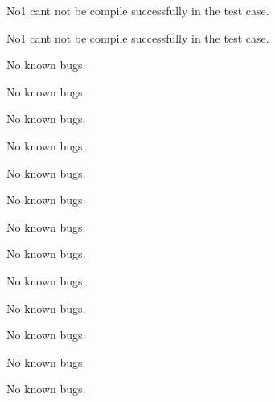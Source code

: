 \begin{DoxyRefList}
No1 can\textquotesingle{}t not be compile successfully in the test case.  
\item[\label{bug__bug000009}%
\hypertarget{bug__bug000009}{}%
File \hyperlink{pclCloudViewer_8h}{pcl\+Cloud\+Viewer.h} ]No1 can\textquotesingle{}t not be compile successfully in the test case.  
\item[\label{bug__bug000012}%
\hypertarget{bug__bug000012}{}%
Class \hyperlink{classpclFastTriangular}{pcl\+Fast\+Triangular} ]No known bugs.  
\item[\label{bug__bug000031}%
\hypertarget{bug__bug000031}{}%
File \hyperlink{pclFastTriangular_8cpp}{pcl\+Fast\+Triangular.cpp} ]No known bugs.  
\item[\label{bug__bug000011}%
\hypertarget{bug__bug000011}{}%
File \hyperlink{pclFastTriangular_8h}{pcl\+Fast\+Triangular.h} ]No known bugs.  
\item[\label{bug__bug000038}%
\hypertarget{bug__bug000038}{}%
File \hyperlink{pclFastTriangularTest_8cpp}{pcl\+Fast\+Triangular\+Test.cpp} ]No known bugs.  
\item[\label{bug__bug000014}%
\hypertarget{bug__bug000014}{}%
Class \hyperlink{classpclIo}{pcl\+Io} ]No known bugs.  
\item[\label{bug__bug000032}%
\hypertarget{bug__bug000032}{}%
File \hyperlink{pclIo_8cpp}{pcl\+Io.cpp} ]No known bugs.  
\item[\label{bug__bug000013}%
\hypertarget{bug__bug000013}{}%
File \hyperlink{pclIo_8h}{pcl\+Io.h} ]No known bugs.  
\item[\label{bug__bug000039}%
\hypertarget{bug__bug000039}{}%
File \hyperlink{pclIoTest_8cpp}{pcl\+Io\+Test.cpp} ]No known bugs.  
\item[\label{bug__bug000016}%
\hypertarget{bug__bug000016}{}%
Class \hyperlink{classpclMlsSmoothing}{pcl\+Mls\+Smoothing} ]No known bugs.  
\item[\label{bug__bug000033}%
\hypertarget{bug__bug000033}{}%
File \hyperlink{pclMlsSmoothing_8cpp}{pcl\+Mls\+Smoothing.cpp} ]No known bugs.  
\item[\label{bug__bug000015}%
\hypertarget{bug__bug000015}{}%
File \hyperlink{pclMlsSmoothing_8h}{pcl\+Mls\+Smoothing.h} ]No known bugs.  
\item[\label{bug__bug000040}%
\hypertarget{bug__bug000040}{}%
File \hyperlink{pclMlsSmoothingTest_8cpp}{pcl\+Mls\+Smoothing\+Test.cpp} ]No known bugs.  
\item[\label{bug__bug000018}%
\hypertarget{bug__bug000018}{}%
Class \hyperlink{classpclPassThrough}{pcl\+Pass\+Through} ]No known bugs.  

\end{DoxyRefList}
